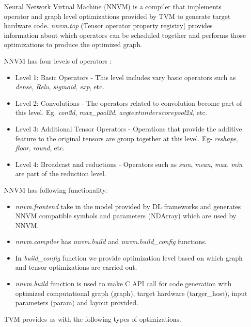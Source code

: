  Neural Network Virtual Machine (NNVM) is a compiler that implements operator and graph level optimizations provided by TVM to generate target hardware code. \textit{nnvm.top} (Tensor operator property registry) provides information about which operators can be scheduled together and performs those optimizations to produce the optimized graph.
 
 NNVM has four levels of operators :
 
 \begin{itemize}
    \item Level 1: Basic Operators - This level includes vary basic operators such as \textit{dense}, \textit{Relu}, \textit{sigmoid}, \textit{exp}, etc.
    \item Level 2: Convolutions - The operators related to convolution become part of this level. Eg. \textit{con2d}, \textit{max\_pool2d}, \textit{avg$textunderscore$pool2d}, etc.
    \item Level 3: Additional Tensor Operators - Operations that provide the additive feature to the original tensors are group together at this level. Eg- \textit{reshape}, \textit{floor}, \textit{round}, etc.
    \item Level 4: Broadcast and reductions - Operators such as \textit{sum}, \textit{mean}, \textit{max},  \textit{min} are part of the reduction level.
 \end{itemize}
 
 NNVM has following functionality:
 
 \begin{itemize}
    \item \textit{nnvm.frontend} take in the model provided by DL frameworks and generates NNVM compatible symbols and parameters (NDArray) which are used by NNVM.
    \item  \textit{nnvm.compiler} has  \textit{nnvm.build} and  \textit{nnvm.build\_config} functions.
    \item In \textit{build\_config} function we provide optimization level based on which graph and tensor optimizations are carried out.
    \item \textit{nnvm.build} function is used to make C API call for code generation with optimized computational graph (graph), target hardware (targer\_host), input parameters (param) and layout provided. 

 \end{itemize}
 
 TVM provides us with the following types of optimizations.
 
